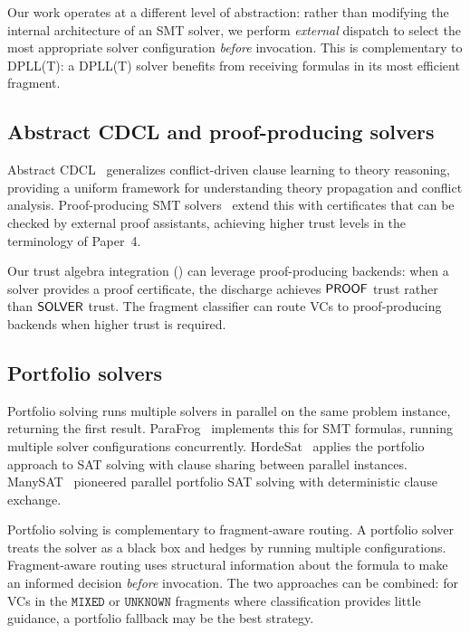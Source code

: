 \documentclass[11pt]{article}
\begin{document}
Our work operates at a different level of abstraction:
rather than modifying the internal architecture of an
SMT solver, we perform \emph{external} dispatch to
select the most appropriate solver configuration
\emph{before} invocation.  This is complementary to
DPLL(T): a DPLL(T) solver benefits from receiving
formulas in its most efficient fragment.

\subsection{Abstract CDCL and proof-producing solvers}

Abstract CDCL~\cite{abstract-cdcl} generalizes conflict-driven
clause learning to theory reasoning, providing a uniform
framework for understanding theory propagation and conflict
analysis.  Proof-producing SMT solvers~\cite{proof-smt}
extend this with certificates that can be checked by
external proof assistants, achieving higher trust levels
in the terminology of Paper~4.

Our trust algebra integration ()
can leverage proof-producing backends: when a solver provides
a proof certificate, the discharge achieves $\mathsf{PROOF}$ trust
rather than $\mathsf{SOLVER}$ trust.  The fragment classifier can
route VCs to proof-producing backends when higher trust is
required.

\subsection{Portfolio solvers}

Portfolio solving runs multiple solvers in parallel on the
same problem instance, returning the first result.
ParaFrog~\cite{parafrog} implements this for SMT formulas,
running multiple solver configurations concurrently.
HordeSat~\cite{hordesat} applies the portfolio approach
to SAT solving with clause sharing between parallel
instances.  ManySAT~\cite{manysat} pioneered parallel
portfolio SAT solving with deterministic clause exchange.

Portfolio solving is complementary to fragment-aware routing.
A portfolio solver treats the solver as a black box and
hedges by running multiple configurations.  Fragment-aware
routing uses structural information about the formula to
make an informed decision \emph{before} invocation.  The
two approaches can be combined: for VCs in the
$\texttt{MIXED}$ or $\texttt{UNKNOWN}$ fragments where
classification provides little guidance, a portfolio
fallback may be the best strategy.
\end{document}
